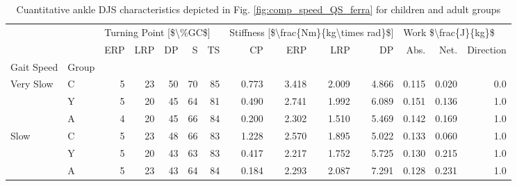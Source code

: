 \begin{table}
\centering
\caption{Cuantitative ankle DJS characteristics depicted in Fig. \ref{fig:comp_speed_QS_ferra} for children and adult groups}
\label{tab:table_ferra}
\begin{tabular}{llrrrrrrrrrrrr}
\toprule
          &   & \multicolumn{5}{l}{Turning Point [\$\textbackslash \%GC\$]} & \multicolumn{4}{l}{Stiffness [\$\textbackslash frac\{Nm\}\{kg\textbackslash times rad\}\$]} & \multicolumn{3}{l}{Work \$\textbackslash frac\{J\}\{kg\}\$} \\
          &   &                    ERP &        LRP &         DP &          S &         TS &                                    CP &        ERP &        LRP &         DP &                Abs. &       Net. &  Direction \\
Gait Speed & Group &                        &            &            &            &            &                                       &            &            &            &                     &            &            \\
\midrule
\multirow{3}{*}{Very Slow} & C &                      5 &         23 &         50 &         70 &         85 &                                 0.773 &      3.418 &      2.009 &      4.866 &               0.115 &      0.020 &        0.0 \\
          & Y &                      5 &         20 &         45 &         64 &         81 &                                 0.490 &      2.741 &      1.992 &      6.089 &               0.151 &      0.136 &        1.0 \\
          & A &                      4 &         20 &         45 &         66 &         84 &                                 0.200 &      2.302 &      1.510 &      5.469 &               0.142 &      0.169 &        1.0 \\
\cline{1-14}
\multirow{3}{*}{Slow} & C &                      5 &         23 &         48 &         66 &         83 &                                 1.228 &      2.570 &      1.895 &      5.022 &               0.133 &      0.060 &        1.0 \\
          & Y &                      5 &         20 &         43 &         63 &         83 &                                 0.417 &      2.217 &      1.752 &      5.725 &               0.130 &      0.215 &        1.0 \\
          & A &                      5 &         23 &         43 &         64 &         84 &                                 0.184 &      2.293 &      2.087 &      7.291 &               0.128 &      0.231 &        1.0 \\

\end{tabular}
\end{table}
